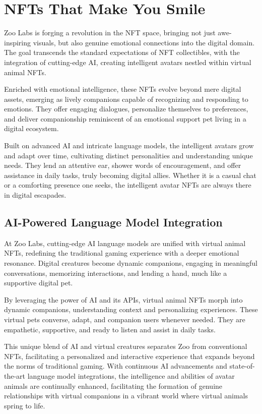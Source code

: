 \section{NFTs That Make You Smile}

Zoo Labs is forging a revolution in the NFT space, bringing not just awe-inspiring visuals, but also genuine emotional connections into the digital domain. The goal transcends the standard expectations of NFT collectibles, with the integration of cutting-edge AI, creating intelligent avatars nestled within virtual animal NFTs.

Enriched with emotional intelligence, these NFTs evolve beyond mere digital assets, emerging as lively companions capable of recognizing and responding to emotions. They offer engaging dialogues, personalize themselves to preferences, and deliver companionship reminiscent of an emotional support pet living in a digital ecosystem.

Built on advanced AI and intricate language models, the intelligent avatars grow and adapt over time, cultivating distinct personalities and understanding unique needs. They lend an attentive ear, shower words of encouragement, and offer assistance in daily tasks, truly becoming digital allies. Whether it is a casual chat or a comforting presence one seeks, the intelligent avatar NFTs are always there in digital escapades.

\subsection{AI-Powered Language Model Integration}

At Zoo Labs, cutting-edge AI language models are unified with virtual animal NFTs, redefining the traditional gaming experience with a deeper emotional resonance. Digital creatures become dynamic companions, engaging in meaningful conversations, memorizing interactions, and lending a hand, much like a supportive digital pet.

By leveraging the power of AI and its APIs, virtual animal NFTs morph into dynamic companions, understanding context and personalizing experiences. These virtual pets converse, adapt, and companion users whenever needed. They are empathetic, supportive, and ready to listen and assist in daily tasks.

This unique blend of AI and virtual creatures separates Zoo from conventional NFTs, facilitating a personalized and interactive experience that expands beyond the norms of traditional gaming. With continuous AI advancements and state-of-the-art language model integrations, the intelligence and abilities of avatar animals are continually enhanced, facilitating the formation of genuine relationships with virtual companions in a vibrant world where virtual animals spring to life.
